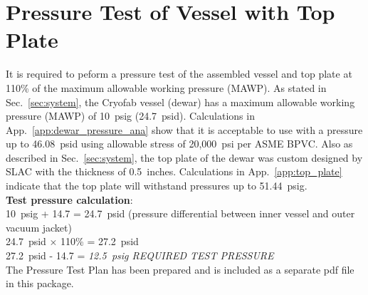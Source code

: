 \section{Pressure Test of Vessel with Top Plate}
\label{sec:pressure_test}

It is required to peform a pressure test of the assembled vessel and top plate 
at 110\% of the maximum allowable working pressure (MAWP).
As stated in Sec.~\ref{sec:system}, the Cryofab vessel (dewar) has a maximum 
allowable working pressure (MAWP) of 10~psig (24.7~psid). 
Calculations in App.~\ref{app:dewar_pressure_ana} show that it is acceptable 
to use with a pressure up to 46.08~psid using allowable stress of 20,000~psi per ASME BPVC.
Also as described in Sec.~\ref{sec:system}, the top plate of the dewar was custom designed 
by SLAC with the thickness of 0.5~inches.
Calculations in App.~\ref{app:top_plate} indicate that the top plate will withstand pressures 
up to 51.44~psig.\\

\textbf{Test pressure calculation}: \\

10~psig + 14.7 = 24.7~psid (pressure differential between inner vessel and outer vacuum jacket) \\
24.7~psid $\times$ 110\% = 27.2~psid \\
27.2~psid - 14.7 = \textit{12.5~psig REQUIRED TEST PRESSURE} \\

The Pressure Test Plan has been prepared and is included as a separate pdf file in this package.